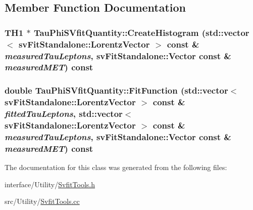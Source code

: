 \subsection{Member Function Documentation}
\hypertarget{classTauPhiSVfitQuantity_ad342382d29321a9663070ec110c0a2e9}{
\subsubsection[{CreateHistogram}]{\setlength{\rightskip}{0pt plus 5cm}TH1 $\ast$ TauPhiSVfitQuantity::CreateHistogram (std::vector$<$ svFitStandalone::LorentzVector $>$ const \& {\em measuredTauLeptons}, \/  svFitStandalone::Vector const \& {\em measuredMET}) const}}
\label{classTauPhiSVfitQuantity_ad342382d29321a9663070ec110c0a2e9}
\hypertarget{classTauPhiSVfitQuantity_ae5319b4e4398ea95ff0ea723c70ce914}{
\subsubsection[{FitFunction}]{\setlength{\rightskip}{0pt plus 5cm}double TauPhiSVfitQuantity::FitFunction (std::vector$<$ svFitStandalone::LorentzVector $>$ const \& {\em fittedTauLeptons}, \/  std::vector$<$ svFitStandalone::LorentzVector $>$ const \& {\em measuredTauLeptons}, \/  svFitStandalone::Vector const \& {\em measuredMET}) const}}
\label{classTauPhiSVfitQuantity_ae5319b4e4398ea95ff0ea723c70ce914}


The documentation for this class was generated from the following files:\begin{DoxyCompactItemize}
\item 
interface/Utility/\hyperlink{SvfitTools_8h}{SvfitTools.h}\item 
src/Utility/\hyperlink{SvfitTools_8cc}{SvfitTools.cc}\end{DoxyCompactItemize}
